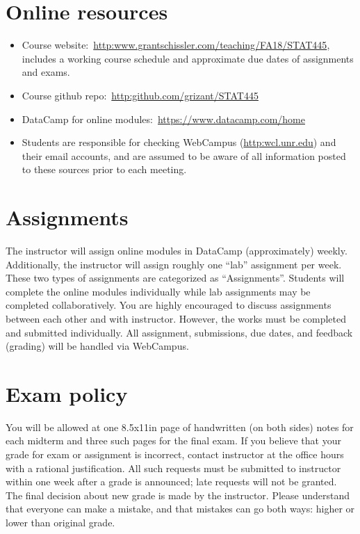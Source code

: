 \documentclass[11pt,onecolumn]{article}
\begin{document}
\section*{Online resources}
\begin{itemize}
    \itemsep0em
\item Course website:~\url{http:www.grantschissler.com/teaching/FA18/STAT445}, includes a working course schedule and approximate due dates of assignments and exams.
\item Course github repo:~\url{http:github.com/grizant/STAT445}
  \item DataCamp for online modules:~\url{https://www.datacamp.com/home}
\item Students are responsible for checking WebCampus (\url{http:wcl.unr.edu}) and their email accounts, and are assumed to be aware of all information posted to these sources prior to each meeting.
\end{itemize}

\section*{Assignments}
The instructor will assign online modules in DataCamp (approximately) weekly. Additionally, the instructor will assign roughly one ``lab'' assignment per week. These two types of assignments are categorized as ``Assignments''. Students will complete the online modules individually while lab assignments may be completed collaboratively. You are highly encouraged to discuss assignments between each other and with instructor. However, the works must be completed and submitted individually. All assignment, submissions, due dates, and feedback (grading) will be handled via WebCampus.

\section*{Exam policy} You will be allowed at one 8.5x11in page of handwritten (on both sides) notes for each midterm and three such pages for the final exam. If you believe that your grade for exam or assignment is incorrect, contact instructor at the office hours with a rational justification. All such requests must be submitted to instructor within one week after a grade is announced; late requests will not be granted. The final decision about new grade is made by the instructor. Please understand that everyone can make a mistake, and that mistakes can go both ways: higher or lower than original grade.
\end{document}
